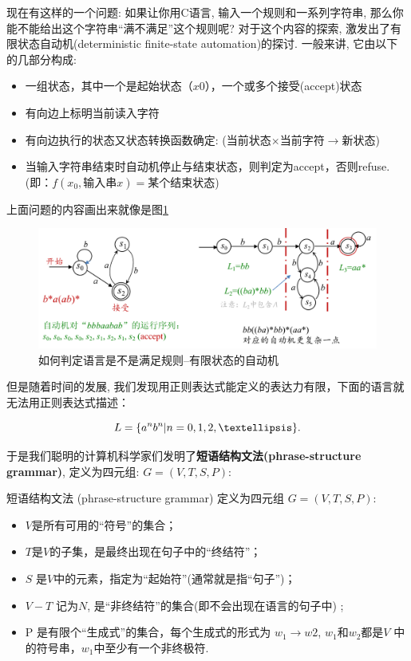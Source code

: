 现在有这样的一个问题: 如果让你用C语言, 输入一个规则和一系列字符串, 那么你能不能给出这个字符串``满不满足''这个规则呢? 对于这个内容的探索, 激发出了有限状态自动机(deterministic finite-state automation)的探讨. 一般来讲, 它由以下的几部分构成:

\begin{itemize}
	\item 一组状态，其中一个是起始状态（$x0$），一个或多个接受(accept)状态
	\item 有向边上标明当前读入字符
	\item 有向边执行的状态又状态转换函数确定: (当前状态$\times$当前字符$\to$新状态)
	\item 当输入字符串结束时自动机停止与结束状态，则判定为accept，否则refuse.(即：$f(x_0, \text{输入串}x)=$某个结束状态)
\end{itemize}

上面问题的内容画出来就像是图\ref{figs:fsa}

\begin{figure}[h!]
	\centering
	\includegraphics[scale=0.8]{4-programs/figs/fsm.png}
	\caption{如何判定语言是不是满足规则--有限状态的自动机}
	\label{figs:fsa}
	
\end{figure}


但是随着时间的发展, 我们发现用正则表达式能定义的表达力有限，下面的语言就无法用正则表达式描述：

$$L = \set{ a^nb^n | n=0,1,2,… }.$$

于是我们聪明的计算机科学家们发明了\textbf{短语结构文法(phrase-structure grammar)}, 定义为四元组: $G=(V,T,S,P)$: 

\begin{definition}[短语结构文法]
短语结构文法 (phrase-structure grammar) 定义为四元组 $G = (V, T, S, P)$:

\begin{itemize}
	\item $V$是所有可用的“符号”的集合；
	\item $T$是$V$的子集，是最终出现在句子中的“终结符”；
	\item $S$ 是$V$中的元素，指定为“起始符”(通常就是指“句子”)；
	\item $V-T$ 记为$N$, 是“非终结符”的集合(即不会出现在语言的句子中) ;
	\item P 是有限个“生成式”的集合，每个生成式的形式为 $w_1\to w2$, $w_1$和$w_2$都是$V$ 中的符号串，$w_1$中至少有一个非终极符.


\end{itemize}
	
\end{definition}


